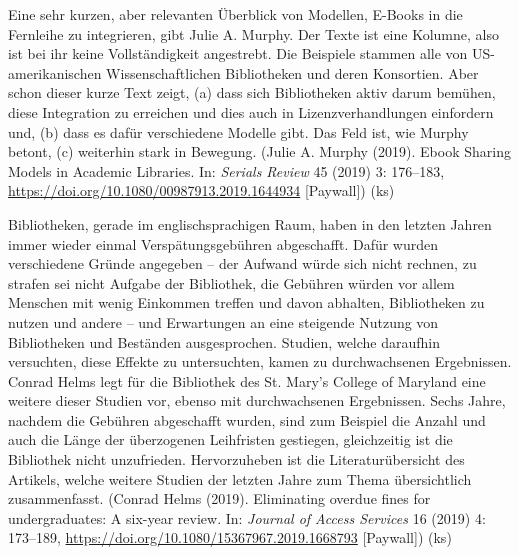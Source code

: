 \documentclass[a4paper,
fontsize=11pt,
oneside,
numbers=noperiodatend,
parskip=half-,
bibliography=totoc,
final
]{scrartcl}
\begin{document}
Eine sehr kurzen, aber relevanten Überblick von Modellen, E-Books in die
Fernleihe zu integrieren, gibt Julie A. Murphy. Der Texte ist eine
Kolumne, also ist bei ihr keine Vollständigkeit angestrebt. Die
Beispiele stammen alle von US-amerikanischen Wissenschaftlichen
Bibliotheken und deren Konsortien. Aber schon dieser kurze Text zeigt,
(a) dass sich Bibliotheken aktiv darum bemühen, diese Integration zu
erreichen und dies auch in Lizenzverhandlungen einfordern und, (b) dass
es dafür verschiedene Modelle gibt. Das Feld ist, wie Murphy betont, (c)
weiterhin stark in Bewegung. (Julie A. Murphy (2019). Ebook Sharing
Models in Academic Libraries. In: \emph{Serials Review} 45 (2019) 3:
176--183, \url{https://doi.org/10.1080/00987913.2019.1644934}
{[}Paywall{]}) (ks)

Bibliotheken, gerade im englischsprachigen Raum, haben in den letzten
Jahren immer wieder einmal Verspätungsgebühren abgeschafft. Dafür wurden
verschiedene Gründe angegeben -- der Aufwand würde sich nicht rechnen,
zu strafen sei nicht Aufgabe der Bibliothek, die Gebühren würden vor
allem Menschen mit wenig Einkommen treffen und davon abhalten,
Bibliotheken zu nutzen und andere -- und Erwartungen an eine steigende
Nutzung von Bibliotheken und Beständen ausgesprochen. Studien, welche
daraufhin versuchten, diese Effekte zu untersuchten, kamen zu
durchwachsenen Ergebnissen. Conrad Helms legt für die Bibliothek des St.
Mary's College of Maryland eine weitere dieser Studien vor, ebenso mit
durchwachsenen Ergebnissen. Sechs Jahre, nachdem die Gebühren
abgeschafft wurden, sind zum Beispiel die Anzahl und auch die Länge der
überzogenen Leihfristen gestiegen, gleichzeitig ist die Bibliothek nicht
unzufrieden. Hervorzuheben ist die Literaturübersicht des Artikels,
welche weitere Studien der letzten Jahre zum Thema übersichtlich
zusammenfasst. (Conrad Helms (2019). Eliminating overdue fines for
undergraduates: A six-year review. In: \emph{Journal of Access Services}
16 (2019) 4: 173--189,
\url{https://doi.org/10.1080/15367967.2019.1668793} {[}Paywall{]}) (ks)
\end{document}
